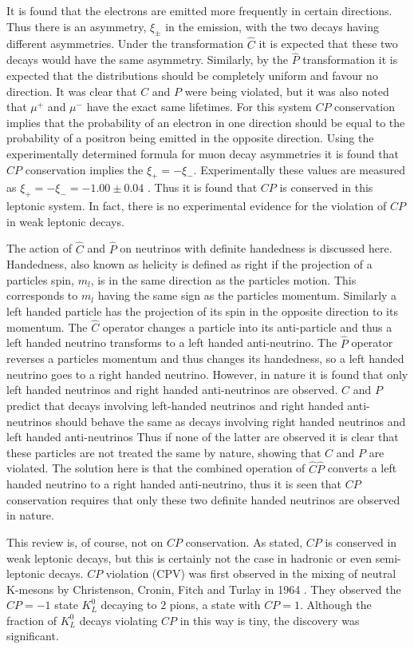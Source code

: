 \noindent It is found that the electrons are emitted more frequently in certain directions. Thus there is an asymmetry, $\xi_{\pm}$ in the emission, with the two decays having different asymmetries. Under the transformation $\hat{C}$ it is expected that these two decays would have the same asymmetry. Similarly, by the $\hat{P}$ transformation it is expected that the distributions should be completely uniform and favour no direction. It was clear that $C$ and $P$ were being violated, but it was also noted that $\mu^{+}$ and $\mu^{-}$ have the exact same lifetimes. For this system $CP$ conservation implies that the probability of an electron in one direction should be equal to the probability of a positron being emitted in the opposite direction. Using the experimentally determined formula for muon decay asymmetries it is found that $CP$ conservation implies the $\xi_{+} = - \xi_{-}$. Experimentally these values are measured as $\xi_{+} = - \xi_{-} =  - 1.00 \pm 0.04$ \cite{Martin+Shaw}. Thus it is found that $CP$ is conserved in this leptonic system. In fact, there is no experimental evidence for the violation of $CP$ in weak leptonic decays.

\noindent The action of $\hat{C}$ and $\hat{P}$ on neutrinos with definite handedness is discussed here. Handedness, also known as helicity is defined as right if the projection of a particles spin, $m_{l}$, is in the same direction as the particles motion. This corresponds to $m_{l}$ having the same sign as the particles momentum. Similarly a left handed particle has the projection of its spin in the opposite direction to its momentum. The $\hat{C}$ operator changes a particle into its anti-particle and thus a left handed neutrino transforms to a left handed anti-neutrino. The $\hat{P}$ operator reverses a particles momentum and thus changes its handedness, so a left handed neutrino goes to a right handed neutrino. However, in nature it is found that only left handed neutrinos and right handed anti-neutrinos are observed. $C$ and $P$ predict that decays involving left-handed neutrinos and right handed anti-neutrinos should behave the same as decays involving right handed neutrinos and left handed anti-neutrinos Thus if none of the latter are observed it is clear that these particles are not treated the same by nature, showing that $C$ and $P$ are violated. The solution here is that the combined operation of $\hat{C}\hat{P}$ converts a left handed neutrino to a right handed anti-neutrino, thus it is seen that $CP$ conservation requires that only these two definite handed neutrinos are observed in nature.               

This review is, of course, not on $CP$ conservation. As stated, $CP$ is conserved in weak leptonic decays, but this is certainly not the case in hadronic or even semi-leptonic decays. $CP$ violation (CPV) was first observed in the mixing of neutral K-mesons by Christenson, Cronin, Fitch and Turlay in 1964 \cite{FirstCPV}. They observed the $CP = -1$ state $K^{0}_L$ decaying to $2$ pions, a state with $CP = 1$. Although the fraction of $K^{0}_L$ decays violating $CP$ in this way is tiny, the discovery was significant.      
